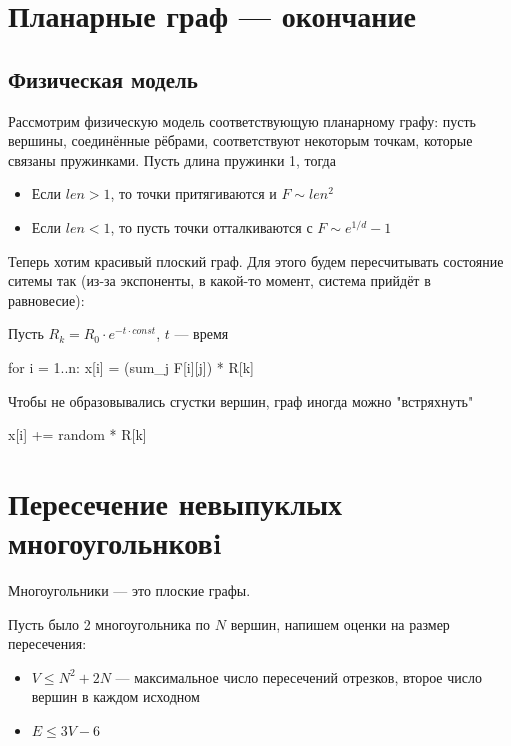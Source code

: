 
\section{Планарные граф --- окончание}

\subsection{Физическая модель}

Рассмотрим физическую модель соответствующую планарному графу:
пусть вершины, соединённые рёбрами, соответствуют некоторым точкам,
которые связаны пружинками. Пусть длина пружинки 1, тогда 

\begin{itemize}
    \item Если $len > 1$, то точки притягиваются и $F \sim len^2$
    \item Если $len < 1$, то пусть точки отталкиваются с $F \sim e^{1/d} - 1$
\end{itemize}

Теперь хотим красивый плоский граф. Для этого будем пересчитывать состояние
ситемы так (из-за экспоненты, в какой-то момент, система прийдёт в равновесие):

Пусть $R_k = R_0 \cdot e^{-t \cdot const}$, $t$ --- время
\begin{cppcode}
    for i = 1..n:
        x[i] = (sum\_j F[i][j]) * R[k]
\end{cppcode}

Чтобы не образовывались сгустки вершин, граф иногда можно "встряхнуть"
\begin{cppcode}
    x[i] += random * R[k]
\end{cppcode}

\section{Пересечение невыпуклых многоугольнковi}

Многоугольники --- это плоские графы.

Пусть было 2 многоугольника по $N$ вершин, напишем оценки на размер пересечения:

\begin{itemize}
    \item $V \leq N^2 + 2N$ --- максимальное число пересечений отрезков,
        второе число вершин в каждом исходном
    \item $E \leq 3V - 6$
\end{itemize}

